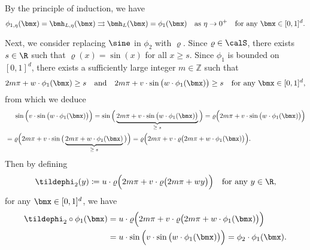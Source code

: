 \documentclass[11pt,a4paper]{article}
\begin{document}
	
	By the principle of induction,  we have
	\begin{equation*}
		\phi_{1,{\eta}}(\bmx) =\bmh_{L ,\eta}(\bmx)
		\rightrightarrows
		\bmh_{L }(\bmx)=
		\phi_{1}(\bmx)
		\quad \tn{as}\   \eta\to 0^+ 
		\quad \tn{for any $\bmx\in[0,1]^d$}.
	\end{equation*}

Next, we consider  replacing \(\sine\) in $\phi_2$ with \(\varrho\). 
Since $\varrho\in\calS$, there exists \( s\in\R \) such that \(\varrho(x) = \sin(x)\) for all \( x \ge s \).
Since $\phi_1$ is bounded on $[0,1]^d$, there exists a sufficiently large integer \( m \in \mathbb{Z} \) such that
\[
    2m\pi  + w\cdot \phi_1(\bmx) \ge s 
    \quad \text{and} \quad
    2m\pi  + v \cdot \sin\big(w\cdot \phi_1(\bmx)\big)  \ge s\quad \tn{for any $\bmx\in[0,1]^d$},
\]
from which we deduce
\begin{equation*}
\begin{split}
    &\phantom{=\;\;}\sin\Big(v \cdot \sin\big(w\cdot \phi_1(\bmx)\big)\Big)
    = \sin\Big(\underbrace{2m \pi + v \cdot \sin\big(w\cdot \phi_1(\bmx)\big)}_{\ge\; s}\Big)
    = \varrho\Big(2m \pi + v \cdot \sin\big(w\cdot \phi_1(\bmx)\big) \Big)
    \\ & = \varrho\Big(2m \pi + v \cdot \sin\big(\underbrace{2m \pi +  w\cdot \phi_1(\bmx)}_{\ge \; s}\big) \Big)
    = \varrho\Big(2m \pi + v \cdot \varrho\big( 2m \pi +   w\cdot \phi_1(\bmx) \big) \Big).
\end{split}
\end{equation*}
Then by defining 
\begin{equation*}
   \tildephi_2(y)
   \coloneqq 
   u\cdot \varrho\Big(2m \pi + v \cdot \varrho\big( 2m \pi +   w y \big) \Big)\quad \tn{for any $y\in\R $,}
\end{equation*}
for any $\bmx\in[0,1]^d$, we have
\begin{equation}
\label{eq:tildephi2:to:phi2}
\begin{split}
\tildephi_2\circ \phi_1(\bmx)
&= u\cdot
\varrho\Big(2m \pi + v \cdot \varrho\big( 2m \pi +   w\cdot \phi_1(\bmx) \big) \Big)
\\&=u\cdot \sin\Big(v \cdot \sin\big(w\cdot \phi_1(\bmx)\big)\Big)
    = \phi_2\cdot\phi_1(\bmx).
\end{split}
\end{equation}
\end{document}
